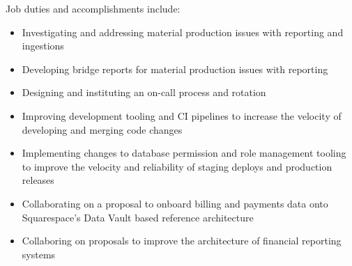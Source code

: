 \normalsize
Job duties and accomplishments include:
\small
\begin{itemize}
    \item Investigating and addressing material production issues with reporting
    and ingestions
    \item Developing bridge reports for material production issues with
    reporting
    \item Designing and instituting an on-call process and rotation
    \item Improving development tooling and CI pipelines to increase the
    velocity of developing and merging code changes
    \item Implementing changes to database permission and role management
    tooling to improve the velocity and reliability of staging deploys and
    production releases
    \item Collaborating on a proposal to onboard billing and payments data onto
    Squarespace's Data Vault based reference architecture
    \item Collaboring on proposals to improve the architecture of financial reporting systems
\end{itemize}
\normalsize
\medskip
